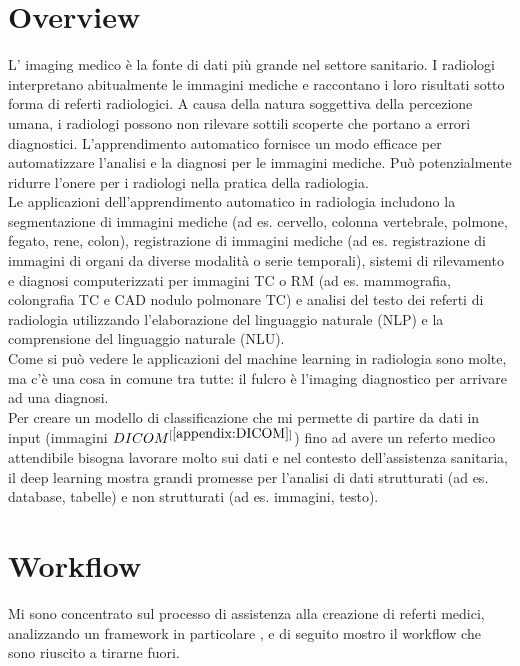 \documentclass[12pt,a4paper]{report}
\begin{document}
\section{Overview}
L’ imaging medico è la fonte di dati più grande nel settore sanitario. 
I radiologi interpretano abitualmente le immagini mediche e raccontano i loro risultati sotto forma di referti radiologici. A causa della natura soggettiva della percezione umana, i radiologi possono non rilevare sottili scoperte che portano a errori diagnostici.
L'apprendimento automatico fornisce un modo efficace per automatizzare l'analisi e la diagnosi per le immagini mediche. Può potenzialmente ridurre l'onere per i radiologi nella pratica della radiologia.\\
Le applicazioni dell'apprendimento automatico in radiologia includono la segmentazione di immagini mediche (ad es. cervello, colonna vertebrale, polmone, fegato, rene, colon), registrazione di immagini mediche (ad es. registrazione di immagini di organi da diverse modalità o serie temporali), sistemi di rilevamento e diagnosi computerizzati per immagini TC o RM (ad es. mammografia, colongrafia TC e CAD nodulo polmonare TC) e analisi del testo dei referti di radiologia utilizzando l'elaborazione del linguaggio naturale (NLP) e la comprensione del linguaggio naturale (NLU).\\
Come si può vedere le applicazioni del machine learning in radiologia sono molte, ma c’è una cosa in comune tra tutte: il fulcro è l’imaging diagnostico per arrivare ad una diagnosi.\\
Per creare un modello di classificazione che mi permette di partire da dati in input (immagini $DICOM^{[\ref{appendix:DICOM}]}$) fino ad avere un referto medico attendibile bisogna lavorare molto sui dati e nel contesto dell'assistenza sanitaria, il deep learning mostra grandi promesse per l'analisi di dati strutturati (ad es. database, tabelle) e non strutturati (ad es. immagini, testo).


\section{Workflow}
Mi sono concentrato sul processo di assistenza alla creazione di referti medici, analizzando un framework in particolare \cite{singh2019chest}, e di seguito mostro il workflow che sono riuscito a tirarne fuori.
\end{document}
